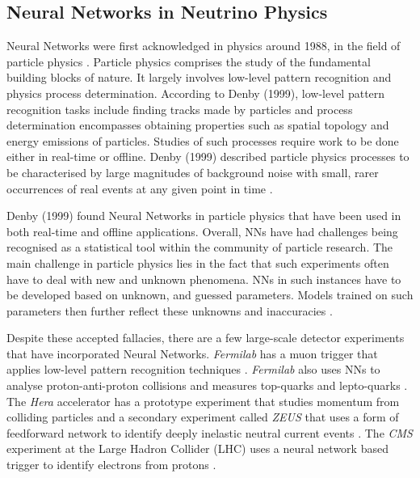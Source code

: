 \subsection{Neural Networks in Neutrino Physics}
Neural Networks were first acknowledged in physics around 1988, in the field of particle physics \cite{denby1999neural}. Particle physics comprises the study of the fundamental building blocks of nature. It largely involves low-level pattern recognition and physics process determination. According to Denby (1999), low-level pattern recognition tasks include finding tracks made by particles and process determination encompasses obtaining properties such as spatial topology and energy emissions of particles. Studies of such processes require work to be done either in real-time or offline. Denby (1999) described particle physics processes to be characterised by large magnitudes of background noise with small, rarer occurrences of real events at any given point in time \cite{denby1999neural}. 

Denby (1999) found Neural Networks in particle physics that have been used in both real-time and offline applications. Overall, NNs have had challenges being recognised as a statistical tool within the community of particle research. The main challenge in particle physics lies in the fact that such experiments often have to deal with new and unknown phenomena. NNs in such instances have to be developed based on unknown, and guessed parameters. Models trained on such parameters then further reflect these unknowns and inaccuracies \cite{denby1999neural}. 

Despite these accepted fallacies, there are a few large-scale detector experiments that have incorporated Neural Networks. \textit{Fermilab} has a muon trigger that applies low-level pattern recognition techniques \cite{adamson2008study}. \textit{Fermilab} also uses NNs to analyse proton-anti-proton collisions and measures top-quarks and lepto-quarks \cite{adamson2008study}. The \textit{Hera} accelerator has a prototype experiment that studies momentum from colliding particles \cite{voss1994electron} and a secondary experiment called \textit{ZEUS} that uses a form of feedforward network to identify deeply inelastic neutral current events \cite{abramowicz1995neural}. The \textit{CMS} experiment at the Large Hadron Collider (LHC) uses a neural network based trigger to identify electrons from protons \cite{chatrchyan2010performance}. 

